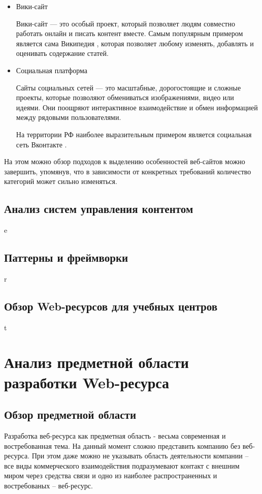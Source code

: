 \begin{itemize}
    \item Вики-сайт
    
    Вики-сайт — это особый проект, который позволяет людям совместно работать онлайн и писать контент вместе. 
    Самым популярным примером является сама Википедия \cite{wiki}, которая позволяет любому изменять, добавлять и оценивать содержание статей.
    
    \item Социальная платформа
    
    Сайты социальных сетей — это масштабные, дорогостоящие и сложные проекты, которые позволяют обмениваться изображениями, видео или идеями. 
    Они поощряют интерактивное взаимодействие и обмен информацией между рядовыми пользователями.
    
    На территории РФ наиболее выразительным примером является социальная сеть Вконтакте \cite{vk}.
\end{itemize}

На этом можно обзор подходов к выделению особенностей веб-сайтов можно завершить, упомянув, что в зависимости от конкретных требований количество категорий может сильно изменяться.

\subsection{Анализ систем управления контентом}
e
\subsection{Паттерны и фреймворки}
r
\subsection{Обзор Web-ресурсов для учебных центров}
t

\section{Анализ предметной области разработки Web-ресурса}
\subsection{Обзор предметной области}
    Разработка веб-ресурса как предметная область - весьма современная и востребованная тема.
    На данный момент сложно представить компанию без веб-ресурса.
    При этом даже можно не указывать область деятельности компании -- все виды коммерческого взаимодействия подразумевают контакт с внешним миром через средства связи и одно из наиболее распространенных и востребованых -- веб-ресурс.
    
